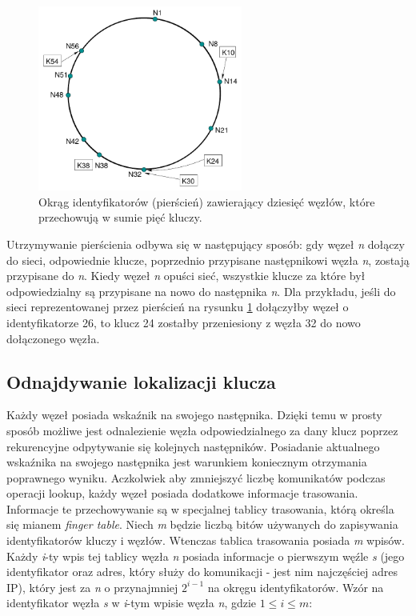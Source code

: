 \documentclass[12pt, twoside, openany]{report}
\begin{document}
\begin{figure}[H]
\centering
\includegraphics[width=0.6\textwidth,height=\textheight,keepaspectratio]{ring.png}
\caption{Okrąg identyfikatorów (pierścień) zawierający dziesięć węzłów, które przechowują w sumie pięć kluczy.}
\label{fig:pierscien}
\end{figure}

Utrzymywanie pierścienia odbywa się w następujący sposób: gdy węzeł \textit{n} dołączy do sieci, odpowiednie klucze, poprzednio przypisane następnikowi węzła \textit{n}, zostają przypisane do \textit{n}. Kiedy węzeł \textit{n} opuści sieć, wszystkie klucze za które był odpowiedzialny są przypisane na nowo do następnika \textit{n}. Dla przykładu, jeśli do sieci reprezentowanej przez pierścień na rysunku \ref{fig:pierscien} dołączyłby węzeł o identyfikatorze 26, to klucz 24 zostałby przeniesiony z węzła 32 do nowo dołączonego węzła.

\subsection{Odnajdywanie lokalizacji klucza}
\label{odnajdywanie_lokalizacji_klucza}

Każdy węzeł posiada wskaźnik na swojego następnika. Dzięki temu w prosty sposób możliwe jest odnalezienie węzła odpowiedzialnego za dany klucz poprzez rekurencyjne odpytywanie się kolejnych następników. Posiadanie aktualnego wskaźnika na swojego następnika jest warunkiem koniecznym otrzymania poprawnego wyniku. Aczkolwiek aby zmniejszyć liczbę komunikatów podczas operacji lookup, każdy węzeł posiada dodatkowe informacje trasowania. Informacje te przechowywanie są w specjalnej tablicy trasowania, którą określa się mianem \textit{finger table}. Niech \textit{m} będzie liczbą bitów używanych do zapisywania identyfikatorów kluczy i węzłów. Wtenczas tablica trasowania posiada \textit{m} wpisów. Każdy \textit{i}-ty wpis tej tablicy węzła \textit{n} posiada informacje o pierwszym węźle \textit{s} (jego identyfikator oraz adres, który służy do komunikacji - jest nim najczęściej adres IP), który jest za \textit{n} o przynajmniej $2^{i-1}$ na okręgu identyfikatorów. Wzór na identyfikator węzła \textit{s} w \textit{i}-tym wpisie węzła \textit{n}, gdzie $1\leq i \leq m$:
\end{document}
